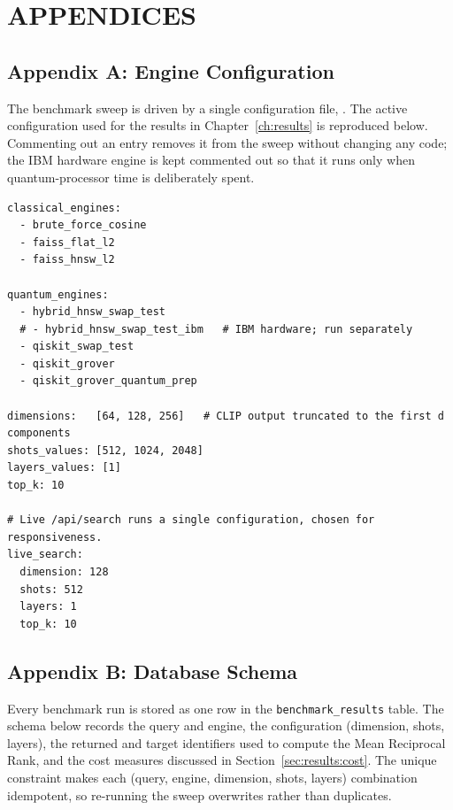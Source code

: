 \chapter{APPENDICES}
\label{ch:appendix}

\section*{Appendix A: Engine Configuration}
{}

The benchmark sweep is driven by a single configuration file,
. The active configuration used for the
results in Chapter~\ref{ch:results} is reproduced below. Commenting out an entry
removes it from the sweep without changing any code; the IBM hardware engine is
kept commented out so that it runs only when quantum-processor time is
deliberately spent.

\begin{lstlisting}[basicstyle=\ttfamily\small,breaklines=true,columns=flexible,frame=single]
classical_engines:
  - brute_force_cosine
  - faiss_flat_l2
  - faiss_hnsw_l2

quantum_engines:
  - hybrid_hnsw_swap_test
  # - hybrid_hnsw_swap_test_ibm   # IBM hardware; run separately
  - qiskit_swap_test
  - qiskit_grover
  - qiskit_grover_quantum_prep

dimensions:   [64, 128, 256]   # CLIP output truncated to the first d components
shots_values: [512, 1024, 2048]
layers_values: [1]
top_k: 10

# Live /api/search runs a single configuration, chosen for responsiveness.
live_search:
  dimension: 128
  shots: 512
  layers: 1
  top_k: 10
\end{lstlisting}

\section*{Appendix B: Database Schema}
{}

Every benchmark run is stored as one row in the \texttt{benchmark\_results}
table. The schema below records the query and engine, the configuration
(dimension, shots, layers), the returned and target identifiers used to compute
the Mean Reciprocal Rank, and the cost measures discussed in
Section~\ref{sec:results:cost}. The unique constraint makes each
(query, engine, dimension, shots, layers) combination idempotent, so re-running
the sweep overwrites rather than duplicates.

